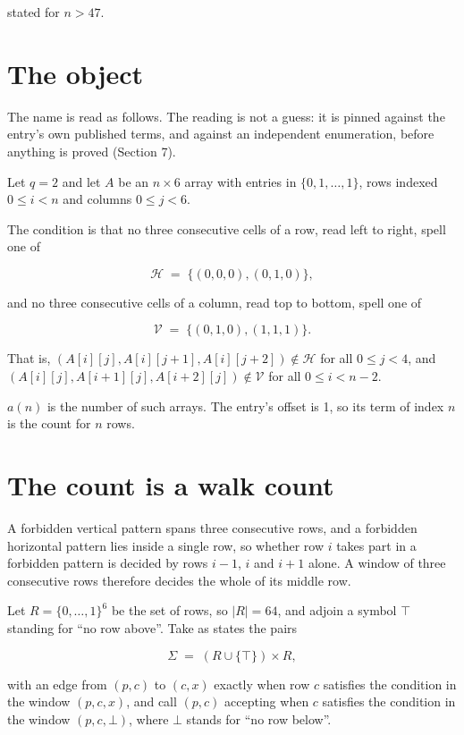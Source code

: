 \documentclass[11pt]{article}
\theoremstyle{definition}
\begin{document}
stated for $n > 47$.

\section{The object}

The name is read as follows. The reading is not a guess: it is pinned against the entry's own published terms, and against an independent enumeration, before anything is proved (Section 7).

Let $q = 2$ and let $A$ be an $n \times 6$ array with entries in $\{0,1,\dots,1\}$, rows indexed $0 \le i < n$ and columns $0 \le j < 6$.

The condition is that no three consecutive cells of a row, read left to right, spell one of

\[\mathcal{H} \;=\; \{(0,0,0), (0,1,0)\},\]

and no three consecutive cells of a column, read top to bottom, spell one of

\[\mathcal{V} \;=\; \{(0,1,0), (1,1,1)\}.\]

That is, $(A[i][j],A[i][j{+}1],A[i][j{+}2]) \notin \mathcal{H}$ for all $0 \le j < 4$, and $(A[i][j],A[i{+}1][j],A[i{+}2][j]) \notin \mathcal{V}$ for all $0 \le i < n-2$.

$a(n)$ is the number of such arrays. The entry's offset is 1, so its term of index $n$ is the count for $n$ rows.

\section{The count is a walk count}

A forbidden vertical pattern spans three consecutive rows, and a forbidden horizontal pattern lies inside a single row, so whether row $i$ takes part in a forbidden pattern is decided by rows $i-1$, $i$ and $i+1$ alone. A window of three consecutive rows therefore decides the whole of its middle row.

Let $R = \{0,\dots,1\}^{6}$ be the set of rows, so $|R| = 64$, and adjoin a symbol $\top$ standing for ``no row above''. Take as states the pairs

\[\Sigma \;=\; (R \cup \{\top\}) \times R,\]

with an edge from $(p,c)$ to $(c,x)$ exactly when row $c$ satisfies the condition in the window $(p,c,x)$, and call $(p,c)$ accepting when $c$ satisfies the condition in the window $(p,c,\bot)$, where $\bot$ stands for ``no row below''.
\end{document}
